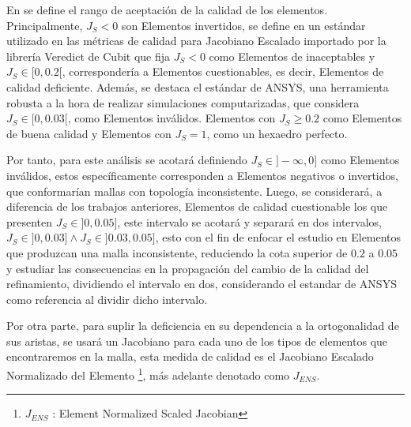 En \cite{daines2018repairing} se define el rango de aceptación de la calidad de los elementos. Principalmente, $J_S < 0$ son Elementos invertidos, se define en \cite{shepherd-2008} un estándar utilizado en las métricas de calidad para Jacobiano Escalado importado por la librería Veredict de Cubit \cite{verdict} que fija $J_S < 0$ como Elementos de inaceptables y $J_{S} \in [0, 0.2[$, correspondería a Elementos cuestionables, es decir, Elementos de calidad deficiente. Además, se destaca el estándar de ANSYS, una herramienta robusta a la hora de realizar simulaciones computarizadas, que considera $J_{S} \in [0, 0.03[$, como Elementos inválidos. Elementos con $J_S \geq 0.2$ como Elementos de buena calidad y Elementos con $J_{S} = 1$, como un hexaedro perfecto.

%
Por tanto, para este análisis se acotará definiendo $J_{S} \in ]-\infty, 0]$ como Elementos inválidos, estos específicamente corresponden a Elementos negativos o invertidos, que conformarían mallas con topología inconsistente. Luego, se considerará, a diferencia de los trabajos anteriores, Elementos de calidad cuestionable los que presenten $J_{S} \in ]0, 0.05]$, este intervalo se acotará y separará en dos intervalos, $J_{S} \in ]0, 0.03] \wedge J_{S} \in ]0.03 , 0.05]$, esto con el fin de enfocar el estudio en Elementos que produzcan una malla inconsistente, reduciendo la cota superior de $0.2$ a $0.05$ y estudiar las consecuencias en la propagación del cambio de la calidad del refinamiento, dividiendo el intervalo en dos, considerando el estandar de ANSYS como referencia al dividir dicho intervalo.

%


Por otra parte, para suplir la deficiencia en su dependencia a la ortogonalidad de sus aristas, se usará un Jacobiano para cada uno de los tipos de elementos que encontraremos en la malla, esta medida de calidad es el Jacobiano Escalado Normalizado del Elemento \footnote{$J_{ENS}$ : Element Normalized Scaled Jacobian}, más adelante denotado como $J_{ENS}$.



